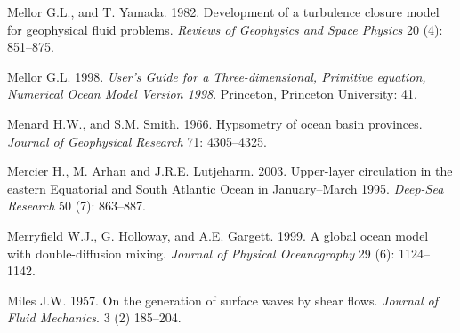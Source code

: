 \begin{thebibliography}{999}
Mellor G.L., and T. Yamada.  1982. Development of a turbulence closure
model for geophysical fluid problems. \textit{Reviews of Geophysics
  and Space Physics} 20 (4): 851--875.
%

Mellor G.L.  1998. \textit{User's Guide for a Three-dimensional,
  Primitive equation, Numerical Ocean Model Version 1998}. Princeton,
Princeton University: 41.
%

Menard H.W., and S.M. Smith.  1966. Hypsometry of ocean basin
provinces.  \textit{Journal of Geophysical Research} 71: 4305--4325.
%

Mercier H., M. Arhan and J.R.E. Lutjeharm.  2003. Upper-layer
circulation in the eastern Equatorial and South Atlantic Ocean in
January--March 1995. \textit{Deep-Sea Research} 50 (7): 863--887.
%

Merryfield W.J., G. Holloway, and A.E. Gargett.  1999. A global ocean
model with double-diffusion mixing. \textit{Journal of Physical
  Oceanography} 29 (6): 1124--1142.
%

Miles J.W.  1957. On the generation of surface waves by shear flows.
\textit{Journal of Fluid Mechanics}. 3 (2) 185--204.
%


\end{thebibliography}
